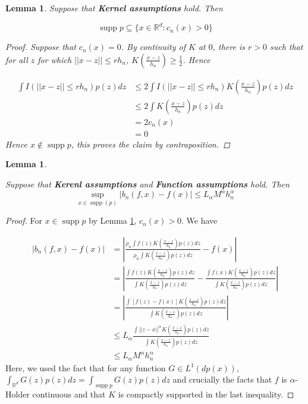 \documentclass{article}
\newtheorem{lemma}[theorem]{Lemma}
\DeclareMathOperator\supp{supp}
\begin{document}
\begin{lemma}
\label{well_cond_lemma}
Suppose that \textbf{Kernel assumptions} hold. Then 

\begin{equation*}
    \supp{p}\subseteq \{x\in\mathbb{R}^d:c_n(x)>0\}
\end{equation*}
\begin{proof}
Suppose that $c_n(x)=0$. By continuity of $K$ at $0$, there is $r>0$ such that for all $z$ for which $||x-z||\leq rh_n$, $K(\frac{x-z}{h_n})\geq \frac{1}{2}$. Hence  

\begin{equation*}
\begin{split}
    \int I(||x-z||\leq rh_n) p(z)dz &\leq 2\int I(||x-z||\leq rh_n)K(\frac{x-z}{h_n})p(z)dz\\
    &\leq 2\int K(\frac{x-z}{h_n})p(z)dz\\
    &=2c_n(x)\\
    &=0
\end{split}
\end{equation*}
Hence $x\notin\supp{p}$, this proves the claim by contraposition.

\end{proof}


\end{lemma}

\begin{lemma}
\label{bias_control_lemma}

Suppose that \textbf{Kerenl assumptions} and \textbf{Function assumptions} hold. Then
    \begin{equation*}
    \sup_{x\in \supp(p)}|b_n(f,x)-f(x)|\leq L_{\alpha}M^{\alpha}h_n^{\alpha}
\end{equation*}
\end{lemma}

\begin{proof}
For $x\in\supp{p}$ by Lemma \ref{well_cond_lemma}, $c_n(x)>0$.
We have 

\begin{equation*}
\begin{split}
|b_n(f,x)-f(x)|&=|\frac{\rho_n\int f(z)K(\frac{x-z}{h_n})p(z)dz}{\rho_n\int K(\frac{x-z}{h_n})p(z)dz}-f(x)|\\
&=|\frac{\int f(z)K(\frac{x-z}{h_n})p(z)dz}{\int K(\frac{x-z}{h_n})p(z)dz}-\frac{\int f(x)K(\frac{x-z}{h_n})p(z)dz}{\int K(\frac{x-z}{h_n})p(z)dz}|\\
&=|\frac{\int[f(z)-f(x)]K(\frac{x-z}{h_n})p(z)dz
}{\int K(\frac{x-z}{h_n})p(z)dz}|\\
&\leq L_{\alpha}\frac{ \int 
||z-x||^{\alpha}K(\frac{x-z}{h_n})p(z)dz}{
\int K(\frac{x-z}{h_n})p(z)dz}\\
&\leq L_{\alpha}M^{\alpha}h_n^{\alpha}
\end{split}
\end{equation*}
Here, we used the fact that for any function $G\in L^1(dp(x))$, $\int_{\mathbb{R}^d} G(z)p(z)dz=\int_{\supp{p}} G(z)p(z)dz$ and crucially the facts that $f$ is $\alpha$-Holder continuous and that $K$ is compactly supported in the last inequality.
\end{proof}
\end{document}
